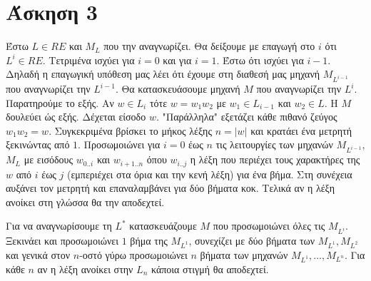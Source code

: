 \documentclass[11pt]{article}
\begin{document}


\section*{Άσκηση 3}
Έστω $L\in RE$ και $M_L$ που την αναγνωρίζει. Θα δείξουμε με επαγωγή στο $i$ ότι $L^i\in RE$. 
Τετριμένα ισχύει για $i=0$ και για $i=1$. Έστω ότι ισχύει για $i-1$. Δηλαδή η επαγωγική 
υπόθεση μας λέει ότι έχουμε στη διαθεσή μας μηχανή $M_{L^{i-1}}$ που αναγνωρίζει την $L^{i-1}$. Θα κατασκευάσουμε
μηχανή $Μ$ που αναγνωρίζει την $L^i$. Παρατηρούμε το εξής. Αν $w\in L_i$ τότε $w=w_1w_2$ με $w_1\in L_{i-1}$ και
$w_2\in L$. Η $M$ δουλεύει ώς εξής. Δέχεται είσοδο $w$. "Παράλληλα" εξετάζει κάθε πιθανό ζεύγος $w_1w_2=w$. Συγκεκριμένα
βρίσκει το μήκος λέξης $n=|w|$ και κρατάει ένα μετρητή ξεκινώντας από $1$. Προσωμοιώνει για $i=0$ έως $n$ τις λειτουργίες
των μηχανών $M_{L^{i-1}}$, $M_L$ με εισόδους $w_{0..i}$ και $w_{i+1..n}$ όπου $w_{i..j}$ η λέξη που περιέχει τους
χαρακτήρες της $w$ από $i$ έως $j$ (εμπεριέχει στα όρια και την κενή λέξη) για ένα βήμα. Στη συνέχεια αυξάνει τον μετρητή
και επαναλαμβάνει για δύο βήματα κοκ. Τελικά αν η λέξη ανοίκει στη γλώσσα θα την αποδεχτεί.

Για να αναγνωρίσουμε τη $L^*$ κατασκευάζουμε $M$ που προσωμοιώνει όλες τις $M_{L^i}$. Ξεκινάει και προσωμοιώνει $1$ βήμα
της $M_{L^1}$, συνεχίζει με δύο βήματα των $M_{L^1},M_{L^2}$ και γενικά στον $n$-οστό γύρω προσωμοιώνει $n$ βήματα των 
μηχανών $M_{L^1},\ldots,M_{L^n}$. Για κάθε $n$ αν η λέξη ανοίκει στην $L_n$ κάποια στιγμή θα αποδεχτεί.



\end{document}
